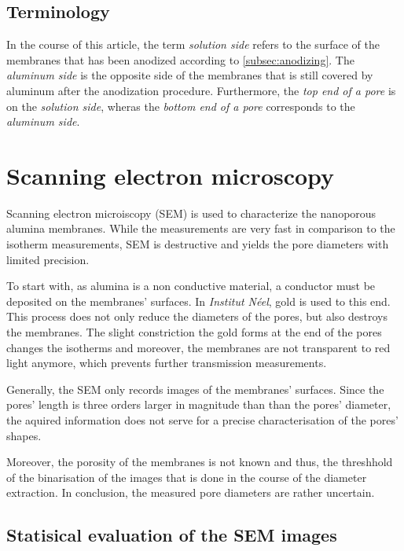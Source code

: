 \documentclass[../thesis.tex]{subfiles}
\begin{document}
      \subsection{Terminology}

        In the course of this article, the term \textit{solution side} refers to the surface of the membranes that has been anodized according to \cref{subsec:anodizing}. The \textit{aluminum side} is the opposite side of the membranes that is still covered by aluminum after the anodization procedure. Furthermore, the \textit{top end of a pore} is on the \textit{solution side}, wheras the \textit{bottom end of a pore} corresponds to the \textit{aluminum side}.


  \section{Scanning electron microscopy}
  \label{sec:sem}

    Scanning electron microiscopy (SEM) is used to characterize the nanoporous alumina membranes. While the measurements are very fast in comparison to the isotherm measurements, SEM is destructive and yields the pore diameters with limited precision.

    To start with, as alumina is a non conductive material, a conductor must be deposited on the membranes' surfaces. In \textit{Institut Néel}, gold is used to this end. This process does not only reduce the diameters of the pores, but also destroys the membranes. The slight constriction the gold forms at the end of the pores changes the isotherms and moreover, the membranes are not transparent to red light anymore, which prevents further transmission measurements.

    Generally, the SEM only records images of the membranes' surfaces. Since the pores' length is three orders larger in magnitude than than the pores' diameter, the aquired information does not serve for a precise characterisation of the pores' shapes.


    Moreover, the porosity of the membranes is not known and thus, the threshhold of the binarisation of the images that is done in the course of the diameter extraction. In conclusion, the measured pore diameters are rather uncertain.
    \medskip


    \subsection{Statisical evaluation of the SEM images}
\end{document}
